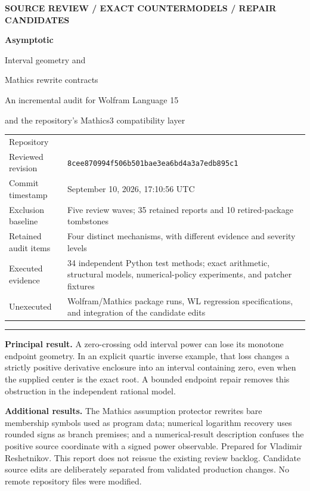 \documentclass[11pt,letterpaper]{article}
\newcommand{\code}[1]{\texttt{\detokenize{#1}}}
\newcommand{\pin}{8cee870994f506b501bae3ea6bd4a3a7edb895c1}
\begin{document}
\begin{titlepage}
\vspace*{0.35in}
{\small\bfseries\color{accent}SOURCE REVIEW \quad / \quad EXACT COUNTERMODELS \quad / \quad REPAIR CANDIDATES}\par
\vspace{0.3in}
{\Huge\bfseries\color{ink}Asymptotic}\par
\vspace{0.15in}
{\LARGE Interval geometry and\par Mathics rewrite contracts}\par
\vspace{0.3in}
{\large An incremental audit for Wolfram Language 15\par and the repository's Mathics3 compatibility layer}\par
\vspace{0.35in}
\begin{tabularx}{\textwidth}{@{}lY@{}}
Repository & \code{VladimirReshetnikov/Asymptotic}\\[5pt]
Reviewed revision & \small\texttt{\pin}\\[5pt]
Commit timestamp & September 10, 2026, 17:10:56 UTC\\[5pt]
Exclusion baseline & Five review waves; 35 retained reports and 10 retired-package tombstones\\[5pt]
Retained audit items & Four distinct mechanisms, with different evidence and severity levels\\[5pt]
Executed evidence & 34 independent Python test methods; exact arithmetic, structural models, numerical-policy experiments, and patcher fixtures\\[5pt]
Unexecuted & Wolfram/Mathics package runs, WL regression specifications, and integration of the candidate edits\\
\end{tabularx}
\vspace{0.28in}\hrule\vspace{0.14in}
\textbf{Principal result.} A zero-crossing odd interval power can lose its monotone endpoint geometry. In an explicit quartic inverse example, that loss changes a strictly positive derivative enclosure into an interval containing zero, even when the supplied center is the exact root. A bounded endpoint repair removes this obstruction in the independent rational model.

\textbf{Additional results.} The Mathics assumption protector rewrites bare membership symbols used as program data; numerical logarithm recovery uses rounded signs as branch premises; and a numerical-result description confuses the positive source coordinate with a signed power observable.
\vfill
{\small Prepared for Vladimir Reshetnikov. This report does not reissue the existing review backlog. Candidate source edits are deliberately separated from validated production changes. No remote repository files were modified.}
\end{titlepage}
\end{document}
